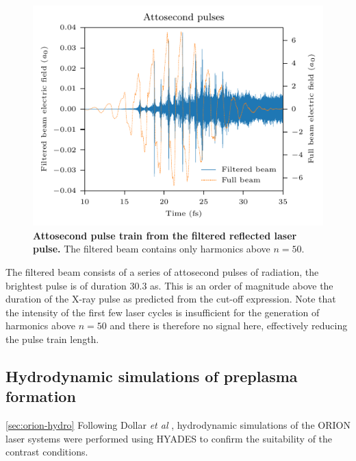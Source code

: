 \begin{figure}
	\centering
	\includegraphics{figures/orion/orion_attosecond_pulse}
	\caption[Attosecond pulse train from the filtered reflected laser pulse.]{\textbf{Attosecond pulse train from the filtered reflected laser pulse.} The filtered beam contains only harmonics above $n = 50$.}
	\label{fig:orionattosecondpulse}
\end{figure}
The filtered beam consists of a series of attosecond pulses of radiation, the brightest pulse is of duration 30.3 as. This is an order of magnitude above the duration of the X-ray pulse as predicted from the cut-off expression. Note that the intensity of the first few laser cycles is insufficient for the generation of harmonics above $n = 50$ and there is therefore no signal here, effectively reducing the pulse train length.


\subsection{Hydrodynamic simulations of preplasma formation}\ref{sec:orion-hydro}
Following Dollar \textit{et al} \cite{dollarScalingHighorderHarmonic2013}, hydrodynamic simulations of the ORION laser systems were performed using HYADES to confirm the suitability of the contrast conditions.

